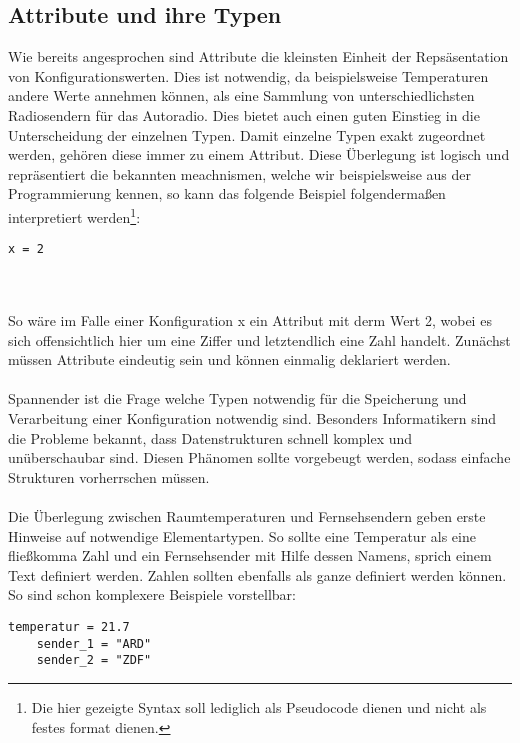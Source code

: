 \subsection{Attribute und ihre Typen}
Wie bereits angesprochen sind Attribute die kleinsten Einheit der Repsäsentation von Konfigurationswerten. Dies ist notwendig, da beispielsweise Temperaturen andere Werte annehmen können, als eine Sammlung von unterschiedlichsten Radiosendern für das Autoradio. Dies bietet auch einen guten Einstieg in die Unterscheidung der einzelnen Typen. Damit einzelne Typen exakt zugeordnet werden, gehören diese immer zu einem Attribut. Diese Überlegung ist logisch und repräsentiert die bekannten meachnismen, welche wir beispielsweise aus der Programmierung kennen, so kann das folgende Beispiel folgendermaßen interpretiert werden\footnote{Die hier gezeigte Syntax soll lediglich als Pseudocode dienen und nicht als festes format dienen.}:
\lstset{language=bash}
\begin{lstlisting}[caption=Zuweisung eines Attributs als Pseudocode , captionpos=b]
   x = 2
\end{lstlisting}
	
\\\\

So wäre im Falle einer Konfiguration x ein Attribut mit derm Wert 2, wobei es sich offensichtlich hier um eine Ziffer und letztendlich eine Zahl handelt. Zunächst müssen Attribute eindeutig sein und können einmalig deklariert werden. 
\\\\
Spannender ist die Frage welche Typen notwendig für die  Speicherung und Verarbeitung einer Konfiguration notwendig sind. Besonders Informatikern sind die Probleme bekannt, dass Datenstrukturen schnell komplex und unüberschaubar sind. Diesen Phänomen sollte vorgebeugt werden, sodass einfache Strukturen vorherrschen müssen. 
\\\\
Die Überlegung zwischen Raumtemperaturen und Fernsehsendern geben erste Hinweise auf notwendige Elementartypen. So sollte eine Temperatur als eine fließkomma Zahl und ein Fernsehsender mit Hilfe dessen Namens, sprich einem Text definiert werden. Zahlen sollten ebenfalls als ganze definiert werden können. So sind schon komplexere Beispiele vorstellbar:
\lstset{language=bash}
\begin{lstlisting}[caption=Zuweisung mehrerer Attribute, captionpos=b]
  temperatur = 21.7
	sender_1 = "ARD"
	sender_2 = "ZDF"
\end{lstlisting}


